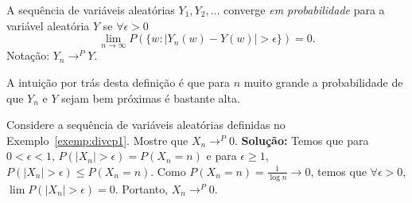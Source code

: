 \begin{frame}
%
\begin{defi}
A sequência de variáveis aleatórias $Y_1,Y_2,\ldots$ converge {\em
em probabilidade} para a variável aleatória $Y$ se
$\forall\epsilon>0$
%
$$\lim_{n\rightarrow\infty}P(\{w:|Y_n(w)-Y(w)|>\epsilon\})=0.$$
Notação: $Y_n\rightarrow^P Y$.
\end{defi}
%
A intuição por trás desta definição é que para $n$ muito grande a
probabilidade de que $Y_n$ e $Y$ sejam bem próximas é bastante alta.
%
%
%
%
%
\begin{exem}
Considere a sequência de variáveis aleatórias definidas no Exemplo~\ref{exemp:divcp1}. Mostre que $X_n\rightarrow^P 0$.
{\bf Solução:} Temos que para $0<\epsilon<1$,
$P(|X_n|>\epsilon)=P(X_n=n)$ e para $\epsilon\geq 1$, $P(|X_n|>\epsilon)\leq P(X_n=n)$. Como $P(X_n=n)=\frac{1}{\log n}\rightarrow 0$, temos que $\forall \epsilon> 0$, $\lim P(|X_n|>\epsilon)=0$. Portanto, $X_n\rightarrow^P 0$.
\end{exem}
%
\end{frame}
%
